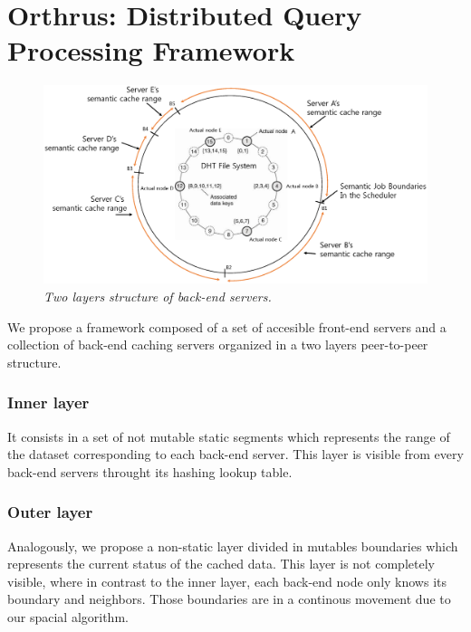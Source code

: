 \section{Orthrus: Distributed Query Processing Framework}


\begin{figure}
\centering \includegraphics[width=.48\textwidth]{arch.eps}
\caption{\textit{Two layers structure of back-end servers.}}
\label{fig:fig1}
\end{figure}




We propose a framework composed of a set of accesible front-end servers 
and a collection of back-end caching servers organized in a two layers peer-to-peer structure.




\subsubsection{Inner layer}
It consists in a set of not mutable static segments which represents the range of the dataset corresponding
to each back-end server. This layer is visible from every back-end servers throught its hashing lookup table.

\subsubsection{Outer layer}
Analogously, we propose a non-static layer divided in mutables boundaries which 
represents the current status of the cached data. This layer is not completely visible, where
in contrast to the inner layer, each back-end node only knows its boundary and neighbors.
Those boundaries are in a continous movement due to our spacial algorithm.

